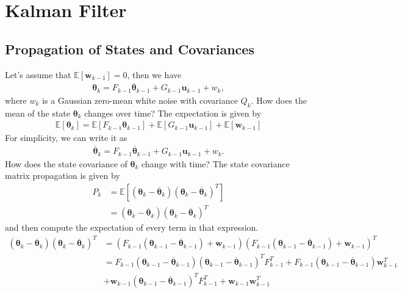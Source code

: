 \chapter{Kalman Filter}
\label{sec:advanced_kalman}


\section{Propagation of States and Covariances}

Let's assume that $\mathbb{E}[\mathbf{w}_{k-1}]=0$, then we have
\begin{align*}
	\boldsymbol{\theta}_{k}=F_{k-1}\overline{\boldsymbol{\theta}}_{k-1}+G_{k-1}\mathbf{u}_{k-1}+w_k,
\end{align*}
where $w_k$ is a Gaussian zero-mean white noise with covariance $Q_k$. How does the mean of the state $\boldsymbol{\theta}_k$ changes over time? The expectation is given by
\begin{align*}
	\mathbb{E}[\boldsymbol{\theta}_{k}]=\mathbb{E}[F_{k-1}\boldsymbol{\theta}_{k-1}]+\mathbb{E}[G_{k-1}\mathbf{u}_{k-1}]+\mathbb{E}[\mathbf{w}_{k-1}]
\end{align*}
For simplicity, we can write it as
\begin{align*}
	\overline{\boldsymbol{\theta}}_{k}=F_{k-1}\overline{\boldsymbol{\theta}}_{k-1}+G_{k-1}\mathbf{u}_{k-1}+w_k.
\end{align*}
How does the state covariance of $\boldsymbol{\theta}_k$ change with time? The state covariance matrix propagation is given by
\begin{align*}
	P_{k}&=\mathbb{E}[(\boldsymbol{\theta}_{k}-\overline{\boldsymbol{\theta}}_{k})(\boldsymbol{\theta}_{k}-\overline{\boldsymbol{\theta}}_{k})^{T}]\\
	&= (\boldsymbol{\theta}_{k}-\overline{\boldsymbol{\theta}}_{k})(\boldsymbol{\theta}_{k}-\overline{\boldsymbol{\theta}}_{k})^{T}
\end{align*}
and then compute the expectation of every term in that expression. 
\begin{align*}
	(\boldsymbol{\theta}_{k}-\overline{\boldsymbol{\theta}}_{k})(\boldsymbol{\theta}_{k}-\overline{\boldsymbol{\theta}}_{k})^{T} & = (F_{k-1}(\boldsymbol{\theta}_{k-1}-\overline{\boldsymbol{\theta}}_{k-1})+\mathbf{w}_{k-1})(F_{k-1}(\boldsymbol{\theta}_{k-1}-\overline{\boldsymbol{\theta}}_{k-1})+\mathbf{w}_{k-1})^{T}\\ 
																							 & = F_{k-1}(\boldsymbol{\theta}_{k-1}-\overline{\boldsymbol{\theta}}_{k-1})(\boldsymbol{\theta}_{k-1}-\overline{\boldsymbol{\theta}}_{k-1})^{T}F_{k-1}^{T}+F_{k-1}(\boldsymbol{\theta}_{k-1}-\overline{\boldsymbol{\theta}}_{k-1})\mathbf{w}_{k-1}^{T} \\ 
																							 & +\mathbf{w}_{k-1}(\boldsymbol{\theta}_{k-1}-\overline{\boldsymbol{\theta}}_{k-1})^{T}F_{k-1}^{T}+\mathbf{w}_{k-1}\mathbf{w}_{k-1}^{T}
\end{align*}
